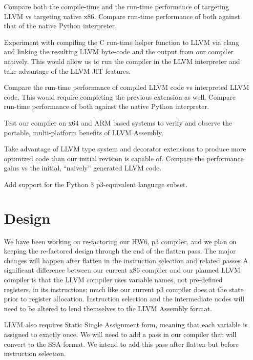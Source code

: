 \documentclass[11pt]{article}
\newenvironment{packed_item}{
\begin{itemize}
  \setlength{\itemsep}{1pt}
  \setlength{\parskip}{0pt}
  \setlength{\parsep}{0pt}
}{\end{itemize}}
\begin{document}
\begin{packed_item}
\item Compare both the compile-time and the run-time performance of
  targeting LLVM vs targeting native x86. Compare run-time performance
  of both against that of the native Python interpreter.
\item Experiment with compiling the C run-time helper function to LLVM
  via clang\cite{clang.llvm.org}
  and linking the resulting LLVM byte-code and the output
  from our compiler natively. This would allow us to run the compiler
  in the LLVM interpreter and take advantage of the LLVM JIT features.
\item Compare the run-time performance of compiled LLVM code vs
  interpreted LLVM code. This would require completing the previous
  extension as well. Compare run-time performance
  of both against the native Python interpreter.
\item Test our compiler on x64 and ARM based systems to verify and
  observe the portable, multi-platform benefits of LLVM Assembly.
\item Take advantage of LLVM type system and decorator extensions to
  produce more optimized code than our initial revision is capable of.
  Compare the performance gains vs the initial, ``naively'' generated
  LLVM code.
\item Add support for the Python 3 p3-equivalent language subset.
\end{packed_item}

\section{Design}

We have been working on re-factoring our HW6, p3 compiler, and we plan
on keeping the re-factored design through the end of the flatten
pass. The major changes will happen after flatten in the instruction
selection and related passes A significant difference between our
current x86 compiler and our planned LLVM compiler is that the LLVM
compiler uses variable names, not pre-defined registers, in its
instructions; much like our current p3 compiler does at the state
prior to register allocation. Instruction selection and the
intermediate nodes will need to be altered to lend themselves to the
LLVM Assembly format.

LLVM also requires Static Single Assignment form, meaning that each
variable is assigned to exactly once.  We will need to add a pass in
our compiler that will convert to the SSA format. We intend to add
this pass after flatten but before instruction selection.
\end{document}
